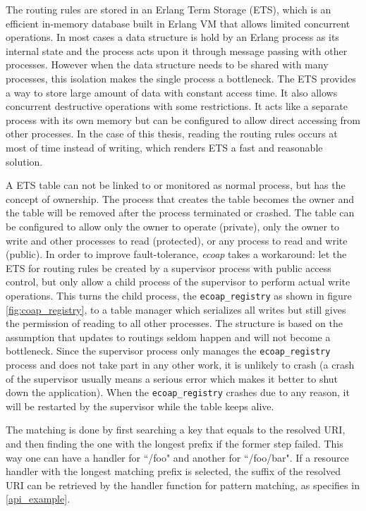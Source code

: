 The routing rules are stored in an Erlang Term Storage (ETS), which is an efficient in-memory database built in Erlang VM that allows limited concurrent operations. In most cases a data structure is hold by an Erlang process as its internal state and the process acts upon it through message passing with other processes. However when the data structure needs to be shared with many processes, this isolation makes the single process a bottleneck. The ETS provides a way to store large amount of data with constant access time. It also allows concurrent destructive operations with some restrictions. It acts like a separate process with its own memory but can be configured to allow direct accessing from other processes. In the case of this thesis, reading the routing rules occurs at most of time instead of writing, which renders ETS a fast and reasonable solution. 

A ETS table can not be linked to or monitored as normal process, but has the concept of ownership. The process that creates the table becomes the owner and the table will be removed after the process terminated or crashed. The table can be configured to allow only the owner to operate (private), only the owner to write and other processes to read (protected), or any process to read and write (public). In order to improve fault-tolerance,   \textit{ecoap} takes a workaround: let the ETS for routing rules be created by a supervisor process with public access control, but only allow a child process of the supervisor to perform actual write operations. This turns the child process, the \verb|ecoap_registry| as shown in figure \ref{fig:coap_registry}, to a table manager which serializes all writes but still gives the permission of reading to all other processes. The structure is based on the assumption that updates to routings seldom happen and will not become a bottleneck. Since the supervisor process only manages the  \verb|ecoap_registry|  process and does not take part in any other work, it is unlikely to crash (a crash of the supervisor usually means a serious error which makes it better to shut down the application). When the \verb|ecoap_registry| crashes due to any reason, it will be restarted by the supervisor while the table keeps alive.  

The matching is done by first searching a key that equals to the resolved URI, and then finding the one with the longest prefix if the former step failed. This way one can have a handler for ``/foo" and another for ``/foo/bar". If a resource handler with the longest matching prefix is selected, the suffix of the resolved URI can be retrieved by the handler function for pattern matching, as specifies in \ref{api_example}.

